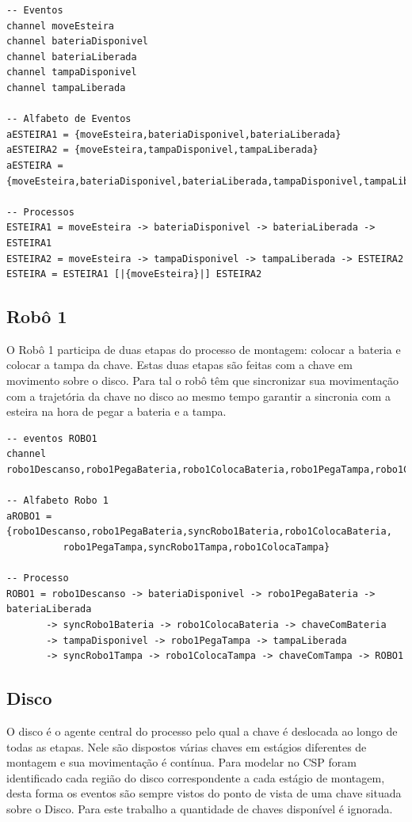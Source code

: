 \documentclass[a4paper,11pt,twocolumns]{article}
\begin{document}
\begin{verbatim}
-- Eventos
channel moveEsteira
channel bateriaDisponivel
channel bateriaLiberada
channel tampaDisponivel
channel tampaLiberada

-- Alfabeto de Eventos
aESTEIRA1 = {moveEsteira,bateriaDisponivel,bateriaLiberada}
aESTEIRA2 = {moveEsteira,tampaDisponivel,tampaLiberada}
aESTEIRA = {moveEsteira,bateriaDisponivel,bateriaLiberada,tampaDisponivel,tampaLiberada}

-- Processos
ESTEIRA1 = moveEsteira -> bateriaDisponivel -> bateriaLiberada -> ESTEIRA1
ESTEIRA2 = moveEsteira -> tampaDisponivel -> tampaLiberada -> ESTEIRA2
ESTEIRA = ESTEIRA1 [|{moveEsteira}|] ESTEIRA2
\end{verbatim}

\subsection{Robô 1}
O Robô 1 participa de duas etapas do processo de montagem: colocar a bateria e colocar a tampa da chave. Estas duas etapas são feitas com a chave em movimento sobre o disco. Para tal o robô têm que sincronizar sua movimentação com a trajetória da chave no disco ao mesmo tempo garantir a sincronia com a esteira na hora de pegar a bateria e a tampa. 

\begin{verbatim}
-- eventos ROBO1
channel robo1Descanso,robo1PegaBateria,robo1ColocaBateria,robo1PegaTampa,robo1ColocaTampa

-- Alfabeto Robo 1
aROBO1 = {robo1Descanso,robo1PegaBateria,syncRobo1Bateria,robo1ColocaBateria,
          robo1PegaTampa,syncRobo1Tampa,robo1ColocaTampa}

-- Processo
ROBO1 = robo1Descanso -> bateriaDisponivel -> robo1PegaBateria -> bateriaLiberada 
       -> syncRobo1Bateria -> robo1ColocaBateria -> chaveComBateria
       -> tampaDisponivel -> robo1PegaTampa -> tampaLiberada
       -> syncRobo1Tampa -> robo1ColocaTampa -> chaveComTampa -> ROBO1
\end{verbatim}

\subsection{Disco}
O disco é o agente central do processo pelo qual a chave é deslocada ao longo de todas as etapas. Nele são dispostos várias chaves em estágios diferentes de montagem e sua movimentação é contínua. Para modelar no CSP foram identificado cada região do disco correspondente a cada estágio de montagem, desta forma os eventos são sempre vistos do ponto de vista de uma chave situada sobre o Disco. Para este trabalho a quantidade de chaves disponível é ignorada.
\end{document}
